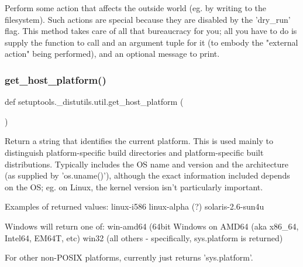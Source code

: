 \begin{DoxyVerb}Perform some action that affects the outside world (eg.  by
writing to the filesystem).  Such actions are special because they
are disabled by the 'dry_run' flag.  This method takes care of all
that bureaucracy for you; all you have to do is supply the
function to call and an argument tuple for it (to embody the
"external action" being performed), and an optional message to
print.
\end{DoxyVerb}
 \mbox{\label{namespacesetuptools_1_1__distutils_1_1util_a727a6cf3ec1c48d19d46feaf74c8d7ed}} 
\subsubsection{\texorpdfstring{get\+\_\+host\+\_\+platform()}{get\_host\_platform()}}
{\footnotesize\ttfamily def setuptools.\+\_\+distutils.\+util.\+get\+\_\+host\+\_\+platform (\begin{DoxyParamCaption}{ }\end{DoxyParamCaption})}

\begin{DoxyVerb}Return a string that identifies the current platform.  This is used mainly to
distinguish platform-specific build directories and platform-specific built
distributions.  Typically includes the OS name and version and the
architecture (as supplied by 'os.uname()'), although the exact information
included depends on the OS; eg. on Linux, the kernel version isn't
particularly important.

Examples of returned values:
   linux-i586
   linux-alpha (?)
   solaris-2.6-sun4u

Windows will return one of:
   win-amd64 (64bit Windows on AMD64 (aka x86_64, Intel64, EM64T, etc)
   win32 (all others - specifically, sys.platform is returned)

For other non-POSIX platforms, currently just returns 'sys.platform'.\end{DoxyVerb}
 \mbox{\label{namespacesetuptools_1_1__distutils_1_1util_accb59dd43f17299b617d6dc2d635cb47}} 

